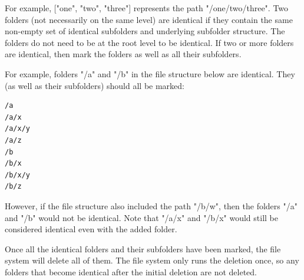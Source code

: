 \documentclass[9pt, b5paaper]{book}
\begin{document}
For example, ["one", "two", "three"] represents the path "/one/two/three".
Two folders (not necessarily on the same level) are identical if they contain the same non-empty set of identical subfolders and underlying subfolder structure. The folders do not need to be at the root level to be identical. If two or more folders are identical, then mark the folders as well as all their subfolders.

For example, folders "/a" and "/b" in the file structure below are identical. They (as well as their subfolders) should all be marked:
\begin{verbatim}
/a
/a/x
/a/x/y
/a/z
/b
/b/x
/b/x/y
/b/z
\end{verbatim}
However, if the file structure also included the path "/b/w", then the folders "/a" and "/b" would not be identical. Note that "/a/x" and "/b/x" would still be considered identical even with the added folder.

Once all the identical folders and their subfolders have been marked, the file system will delete all of them. The file system only runs the deletion once, so any folders that become identical after the initial deletion are not deleted.
\end{document}
